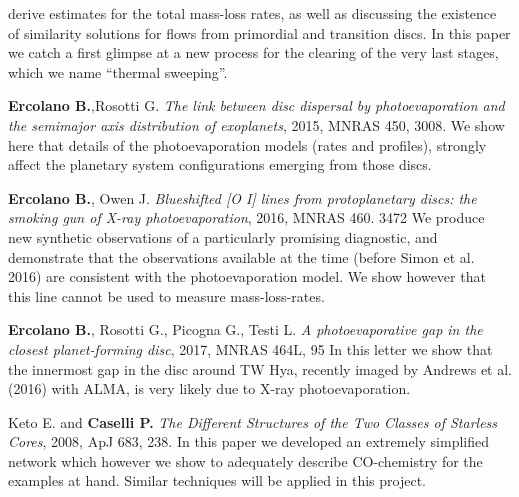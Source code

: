 \documentclass[10pt,fleqn,twoside]{article}
\begin{document}
\begin{literature}
  derive estimates for the total mass-loss rates, as well as
  discussing the existence of similarity solutions for flows from
  primordial and transition discs. In this paper we catch a first
  glimpse at a new process for the clearing of the very last stages,
  which we name ``thermal sweeping''.
\item \textbf{Ercolano B.},Rosotti G. {\em The link between disc
    dispersal by photoevaporation and the semimajor axis distribution
    of exoplanets}, 2015, MNRAS 450,
  3008. We show here that details of the photoevaporation models
  (rates and profiles), strongly affect the planetary system
  configurations emerging from those discs. 
\item \textbf{Ercolano B.}, Owen J.  {\em Blueshifted [O I] lines from
    protoplanetary discs: the smoking gun of X-ray photoevaporation},
  2016, MNRAS 460. 3472
  We produce new synthetic observations of a particularly promising
  diagnostic, and demonstrate that the observations available at the
  time (before Simon et al. 2016) are consistent with the
  photoevaporation model. We show however that this line cannot be
  used to measure mass-loss-rates. 
\item \textbf{Ercolano B.}, Rosotti G., Picogna G., Testi L.  {\em A photoevaporative gap in the closest planet-forming disc},
  2017, MNRAS 464L, 95
 In this letter we show that the innermost gap in the disc around TW
 Hya, recently imaged by Andrews et al. (2016) with ALMA, is very
 likely due to X-ray photoevaporation. 
\item Keto E. and \textbf{Caselli P.}  \textit{The Different Structures of the Two Classes of Starless Cores}, 2008, ApJ
  683, 238. In this paper we developed an extremely simplified network
  which however we show to adequately describe CO-chemistry for the
  examples at hand. Similar techniques will be applied in this
  project. 
\end{literature}


% 
% 
% 
% 
% 
\end{document}
